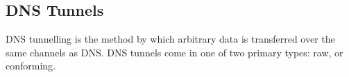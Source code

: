 \documentclass{llncs}
\begin{document}
%

\subsection{DNS Tunnels}
\label{tunnels-types}
DNS tunnelling is the method by which arbitrary data is transferred
over the same channels as DNS. DNS tunnels come in one of two primary
types: raw, or conforming.
\end{document}
